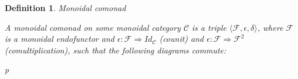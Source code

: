 \documentclass[a4paper]{article}
\newtheorem{defin}{Definition}
\begin{document}
\begin{defin} Monoidal comonad
  $ $

  A monoidal comonad on some monoidal category $\mathcal{C}$ is a triple $\langle \mathcal{F}, \epsilon, \delta \rangle$,
  where $\mathcal{F}$ is a monoidal endofunctor and $\epsilon : \mathcal{F} \Rightarrow Id_{\mathcal{C}}$ (counit) and $\epsilon : \mathcal{F} \Rightarrow \mathcal{F}^2$ (comultiplication),
  such that the following diagrams commute:

\begin{minipage}{0.45\textwidth}
\begin{small}
\end{small}
\end{minipage}%
\hfill
\begin{minipage}{0.5\textwidth}
\begin{tabular}{p{\textwidth}}
\end{tabular}
\end{minipage}%


\end{defin}
\end{document}
